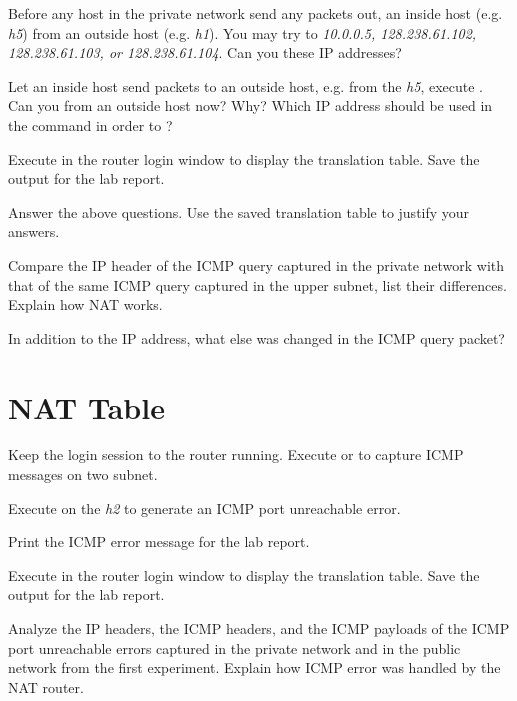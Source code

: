 \documentclass{../UTNetLab}
\begin{document}
Before any host in the private network send any packets out,  an inside host (e.g. \textit{h5}) from an outside host (e.g. \textit{h1}).
You may try to  \textit{10.0.0.5, 128.238.61.102, 128.238.61.103, or 128.238.61.104}.
Can you  these IP addresses?

Let an inside host send packets to an outside host, e.g. from the \textit{h5}, execute .
Can you  from an outside host now? Why? Which IP address should be used in the  command in order to ?

Execute  in the router login window to display the translation table.
Save the output for the lab report.

\begin{report}
    \item Answer the above questions.
    Use the saved translation table to justify your answers.

    \item Compare the IP header of the ICMP query captured in the private network with that of the same ICMP query captured in the upper subnet, list their differences.
    Explain how NAT works.

    \item In addition to the IP address, what else was changed in the ICMP query packet?
\end{report}

\section{NAT Table}
Keep the login session to the router running.
Execute  or  to capture ICMP messages on two subnet.

Execute  on the \textit{h2} to generate an ICMP port unreachable error.

Print the ICMP error message for the lab report.

Execute  in the router login window to display the translation table.
Save the output for the lab report.

\begin{report}
    \item Analyze the IP headers, the ICMP headers, and the ICMP payloads of the ICMP port unreachable errors captured in the private network and in the public network from the first experiment.
    Explain how ICMP error was handled by the NAT router.
\end{report}
\end{document}
